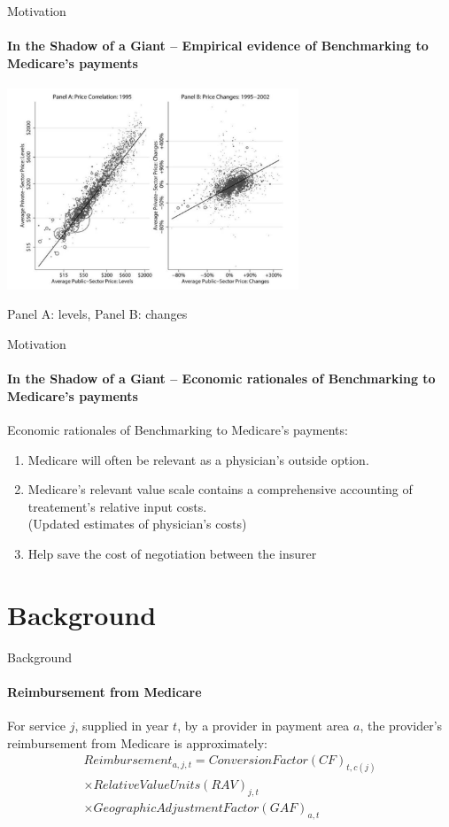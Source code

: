 \documentclass{beamer}
\begin{document}
\begin{frame}{Motivation}
\framesubtitle{In the Shadow of a Giant -- Empirical evidence of Benchmarking to Medicare's payments}
\begin{center}
\includegraphics[height=6cm]{fig1}
\end{center}
Panel A: levels, Panel B: changes
\end{frame}

\begin{frame}{Motivation}
\framesubtitle{In the Shadow of a Giant -- Economic rationales of Benchmarking to Medicare's payments}
Economic rationales of Benchmarking to Medicare's payments:
\begin{enumerate}
\item Medicare will often be  relevant as a physician's outside option.
\item Medicare's relevant value scale contains a comprehensive accounting of treatement's relative input costs.\\
        (Updated estimates of physician's costs)
\item Help save the cost of negotiation between the insurer 
\end{enumerate}
\end{frame}

\section{Background}
\begin{frame}{Background}
\framesubtitle{Reimbursement from Medicare}
For service $j$, supplied in year $t$, by a provider in payment area $a$, the provider's reimbursement from Medicare  is approximately:
\begin{eqnarray*}
Reimbursement_{a,j,t} = Conversion Factor (CF)_{t,c(j)} \\
\times Relative Value Units (RAV)_{j,t} \\
\times Geographic Adjustment Factor (GAF)_{a,t}
\end{eqnarray*}
\end{frame}
\end{document}
